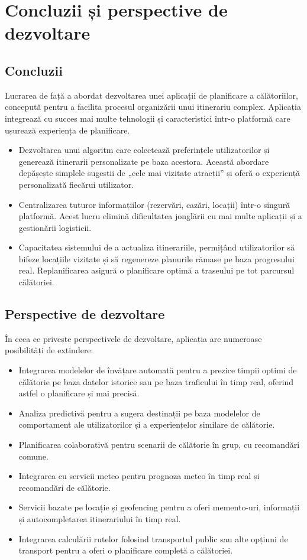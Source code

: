 \chapter{Concluzii și perspective de dezvoltare}

\section{Concluzii}
Lucrarea de față a abordat dezvoltarea unei aplicații de planificare a călătoriilor, concepută pentru a facilita procesul organizării unui itinerariu complex. Aplicația integrează cu succes mai multe tehnologii și caracteristici într-o platformă care ușurează experiența de planificare.

\begin{itemize}
    \item Dezvoltarea unui algoritm care colectează preferințele utilizatorilor și generează itinerarii personalizate pe baza acestora. Această abordare depășește simplele sugestii de „cele mai vizitate atracții” și oferă o experiență personalizată fiecărui utilizator.
    \item Centralizarea tuturor informațiilor (rezervări, cazări, locații) într-o singură platformă. Acest lucru elimină dificultatea jonglării cu mai multe aplicații și a gestionării logisticii.
    \item Capacitatea sistemului de a actualiza itinerariile, permițând utilizatorilor să bifeze locațiile vizitate și să regenereze planurile rămase pe baza progresului real. Replanificarea asigură o planificare optimă a traseului pe tot parcursul călătoriei.
\end{itemize}

\section{Perspective de dezvoltare}
În ceea ce privește perspectivele de dezvoltare, aplicația are numeroase posibilități de extindere:

\begin{itemize}
    \item Integrarea modelelor de învățare automată pentru a prezice timpii optimi de călătorie pe baza datelor istorice sau pe baza traficului în timp real, oferind astfel o planificare și mai precisă.
    \item Analiza predictivă pentru a sugera destinații pe baza modelelor de comportament ale utilizatorilor și a experiențelor similare de călătorie.
    \item Planificarea colaborativă pentru scenarii de călătorie în grup, cu recomandări comune.
    \item Integrarea cu servicii meteo pentru prognoza meteo în timp real și recomandări de călătorie.
    \item Servicii bazate pe locație și geofencing pentru a oferi memento-uri, informații și autocompletarea itinerariului în timp real.
    \item Integrarea calculării rutelor folosind transportul public sau alte opțiuni de transport pentru a oferi o planificare completă a călătoriei.
\end{itemize}